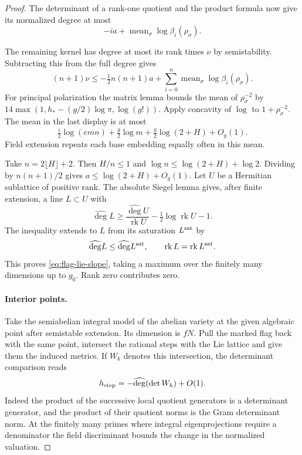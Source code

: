 \begin{proof}
The determinant of a rank-one quotient and the product formula
now give its normalized degree at most
\[
 -ia+\operatorname{mean}_\sigma\log\beta_i(\rho_\sigma).
\]

The remaining kernel has degree at most its rank times \(\nu\) by
semistability. Subtracting this from the full degree gives
\[
 (n+1)\nu\le -\tfrac12n(n+1)a+
           \sum_{i=0}^n\operatorname{mean}_\sigma\log\beta_i(\rho_\sigma).
\]
For principal polarization the matrix lemma bounds the mean of
\(\rho_\sigma^{-2}\) by \(14\max(1,h_*-(g/2)\log\pi,\log(g!))\).
Apply concavity of \(\log\) to \(1+\rho_\sigma^{-2}\). The mean in
the last display is at most
\[
  \tfrac i2\log(e m n)+\tfrac g2\log m+
        \tfrac g2\log(2+H)+O_g(1).
\]
Field extension repeats each base embedding equally often in this
mean.

Take \(n=2\lfloor H\rfloor+2\). Then \(H/n\le1\) and
\(\log n\le\log(2+H)+\log 2\). Dividing by \(n(n+1)/2\) gives
\(a\le\log(2+H)+O_g(1)\). Let \(U\) be a Hermitian sublattice of positive rank. The absolute
Siegel lemma gives, after finite extension, a line \(L\subset U\)
with
\[
    \widehat{\deg} L\ge \frac{\widehat{\deg} U}{\operatorname{rk}U}
                         -\tfrac12\log\operatorname{rk}U-1.
\]
The inequality extends to \(L\) from its saturation \(L^{\rm sat}\) by
\[
 \widehat{\deg} L\le\widehat{\deg} L^{\rm sat},\qquad \operatorname{rk}L=\operatorname{rk}L^{\rm sat}.
\]
This proves \eqref{eq:flag-lie-slope}, taking
a maximum over the finitely many dimensions up to \(g_0\). Rank zero
contributes zero. \cite{matrix-flag,absolute-siegel-flag}

\paragraph{Interior points.}
Take the semiabelian integral model of the abelian variety at the
given algebraic point after semistable extension. Its dimension is
\(fN\). Pull the marked flag back with the same point, intersect the
rational steps with the Lie lattice and give them the induced
metrics. If \(W_k\) denotes this intersection, the determinant comparison reads
\[
 h_{\rm step}=-\widehat{\deg}(\det W_k)+O(1).
\]
Indeed the product of the successive local quotient generators is
a determinant generator, and the product of their quotient norms is
the Gram determinant norm. At the finitely many primes where
integral eigenprojections require a denominator the field
discriminant bounds the change in the normalized valuation.


\end{proof}

